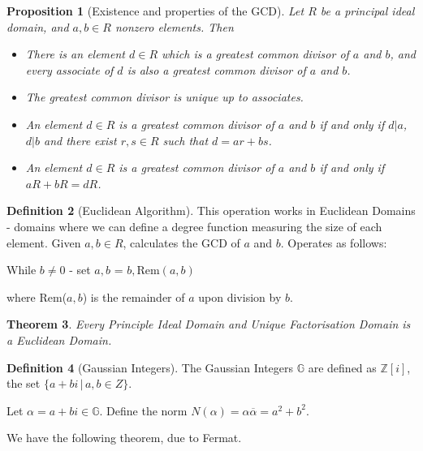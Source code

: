 \documentclass[10pt, oneside, reqno]{amsart}
\theoremstyle{plain}%
\newtheorem{thm}{Theorem}[section]
\newtheorem{prop}[thm]{Proposition}
\theoremstyle{definition}
\newtheorem{defn}[thm]{Definition}
\theoremstyle{remark}
\newcommand{\al}{\alpha}
\newcommand{\Z}{\mathbb{Z}}
\newcommand{\Ga}{\mathbb{G}}
\begin{document}
\begin{prop}[Existence and properties of the GCD]
    Let $R$ be a principal ideal domain, and $a,b \in R$ nonzero elements.  Then
    \begin{itemize}
        \item There is an element $d \in R$ which is a greatest common divisor of $a$ and $b$, and every associate of $d$ is also a greatest common divisor of $a$ and $b$.
        \item The greatest common divisor is unique up to associates.
        \item An element $d \in R$ is a greatest common divisor of $a$ and $b$ if and only if $d | a$, $d|b$ and there exist $r,s \in R$ such that $d = ar + bs$.  
        \item An element $d \in R$ is a greatest common divisor of $a$ and $b$ if and only if $aR + bR = dR$. 
    \end{itemize}
\end{prop}


\begin{defn}[Euclidean Algorithm]
    This operation works in Euclidean Domains - domains where we can define a degree function measuring the size of each element.
    Given $a,b \in R$, calculates the GCD of $a$ and $b$.  Operates as follows:
    
    While $b \neq 0$ - set $a,b$ = $b, \text{Rem}(a,b)$
    
    where Rem($a,b$) is the remainder of $a$ upon division by $b$.
\end{defn}

\begin{thm}
    Every Principle Ideal Domain and Unique Factorisation Domain is a Euclidean Domain.
\end{thm}



\begin{defn}[Gaussian Integers]
    The Gaussian Integers $\Ga$ are defined as $\Z[i]$, the set $\{ a + b i \, | \, a, b \in Z \}$.
\end{defn}

Let $\alpha = a + bi \in \Ga$. Define the norm $N(\alpha) = \al \overline{\al} = a^2 + b^2$.  

We have the following theorem, due to Fermat.
\end{document}
